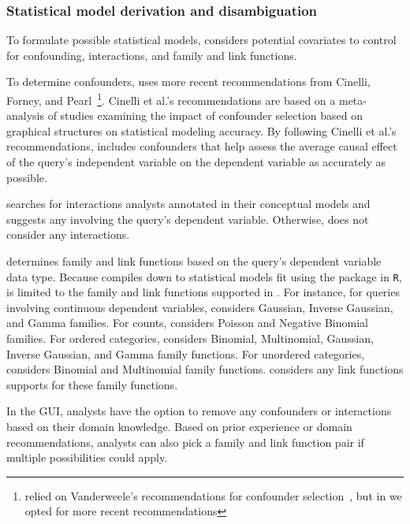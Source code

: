 \subsubsection{Statistical model derivation and disambiguation}
\statisticalModelDisambiguation
To formulate possible statistical models, \rTisane considers potential
covariates to control for confounding, interactions, and family and link
functions.

To determine confounders, \rTisane uses more recent recommendations from
Cinelli, Forney, and Pearl~\cite{cinelli2020controls}\footnote{\tisane relied on
Vanderweele's recommendations for confounder
selection~\cite{vanderweele2019modifiedDisjunctiveCriterion}, but in \rTisane we
opted for more recent recommendations}. Cinelli et al.'s recommendations are
based on a meta-analysis of studies examining the impact of confounder selection
based on graphical structures on statistical modeling accuracy. By following
Cinelli et al.'s recommendations, \rTisane includes confounders that help assess
the average causal effect of the query's independent variable on the dependent
variable as accurately as possible. 

\rTisane searches for interactions analysts annotated in their conceptual models
and suggests any involving the query's dependent variable. Otherwise, \rTisane
does not consider any interactions. 

\rTisane determines family and link functions based on the query's dependent
variable data type.  Because \rTisane compiles down to statistical models fit
using the \lme package in \texttt{R}, \rTisane is limited to the family and link
functions supported in \lme. For instance, for queries involving continuous
dependent variables, \rTisane considers Gaussian, Inverse Gaussian, and Gamma
families. For counts, \rTisane considers Poisson and Negative Binomial families.
For ordered categories, \rTisane considers Binomial, Multinomial, Gaussian,
Inverse Gaussian, and Gamma family functions. For unordered categories, \rTisane
considers Binomial and Multinomial family functions. \rTisane considers any link
functions \lme supports for these family functions. 

In the GUI, analysts have the option to remove any confounders or interactions
based on their domain knowledge. Based on prior experience or domain
recommendations, analysts can also pick a family and link function pair if
multiple possibilities could apply. 